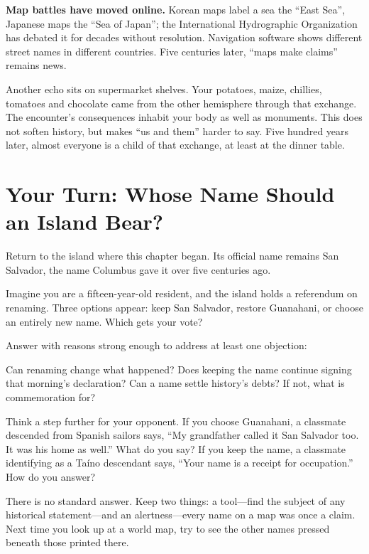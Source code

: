 \textbf{Map battles have moved online.} Korean maps label a sea the ``East Sea'', Japanese maps the ``Sea of Japan''; the International Hydrographic Organization has debated it for decades without resolution. Navigation software shows different street names in different countries. Five centuries later, ``maps make claims'' remains news.

Another echo sits on supermarket shelves. Your potatoes, maize, chillies, tomatoes and chocolate came from the other hemisphere through that exchange. The encounter's consequences inhabit your body as well as monuments. This does not soften history, but makes ``us and them'' harder to say. Five hundred years later, almost everyone is a child of that exchange, at least at the dinner table.

\section[Your Turn: Whose Name for an Island?]{Your Turn: Whose Name Should an Island Bear?}
Return to the island where this chapter began. Its official name remains San Salvador, the name Columbus gave it over five centuries ago.

Imagine you are a fifteen-year-old resident, and the island holds a referendum on renaming. Three options appear: keep San Salvador, restore Guanahani, or choose an entirely new name. Which gets your vote?

Answer with reasons strong enough to address at least one objection:

Can renaming change what happened? Does keeping the name continue signing that morning's declaration? Can a name settle history's debts? If not, what is commemoration for?

Think a step further for your opponent. If you choose Guanahani, a classmate descended from Spanish sailors says, ``My grandfather called it San Salvador too. It was his home as well.'' What do you say? If you keep the name, a classmate identifying as a Taíno descendant says, ``Your name is a receipt for occupation.'' How do you answer?

There is no standard answer. Keep two things: a tool---find the subject of any historical statement---and an alertness---every name on a map was once a claim. Next time you look up at a world map, try to see the other names pressed beneath those printed there.

